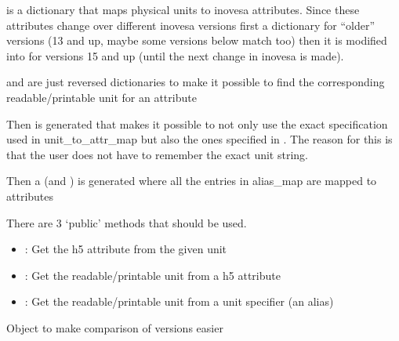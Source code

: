 \documentclass[letterpaper,10pt,openany,oneside,english]{sphinxmanual}
\begin{document}
 is a dictionary that maps physical units to inovesa attributes. Since these attributes change  
over different inovesa versions first a dictionary for “older” versions (13 and up, maybe some versions below match too)  
then it is modified into  for versions 15 and up (until the next change in inovesa is made).

 and  are just reversed dictionaries to make it possible to find the corresponding  
readable/printable unit for an attribute

Then  is generated that makes it possible to not only use the exact specification used in unit\_to\_attr\_map  
but also the ones specified in . The reason for this is that the user does not have to remember the exact  
unit string.

Then a  (and ) is generated where all the entries in alias\_map are  
mapped to attributes

There are 3 ‘public’ methods that should be used.
\begin{itemize}
\item {} 
: Get the h5 attribute from the given unit

\item {} 
: Get the readable/printable unit from a h5 attribute

\item {} 
: Get the readable/printable unit from a unit specifier (an alias)

\end{itemize}

\begin{fulllineitems}
\label{\detokenize{utils:utils.UnitError}}
\end{fulllineitems}


\begin{fulllineitems}
\label{\detokenize{utils:utils.InovesaVersion}}
Object to make comparison of versions easier

\end{fulllineitems}
\end{document}
